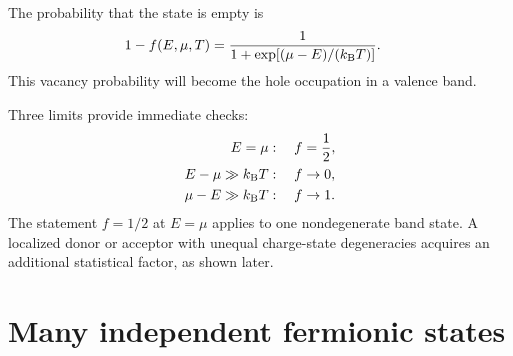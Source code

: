 The probability that the state is empty is
\begin{equation}
\begin{aligned}
  1-f(E,\mu,T)
  &=\frac{1}{1+\exp[(\mu-E)/(k_{\mathrm B} T)]}.
\end{aligned}
  \label{eq:empty-fermion-state-probability-statmech}
\end{equation}
This vacancy probability will become the hole occupation in a valence band.

Three limits provide immediate checks:
\begin{align}
  E=\mu&:\quad f=\frac12,
  \label{eq:statmech-half-occupation}\\
  E-\mu\gg k_{\mathrm B} T&:\quad f\rightarrow0,
  \label{eq:statmech-empty-high-state}\\
  \mu-E\gg k_{\mathrm B} T&:\quad f\rightarrow1.
  \label{eq:statmech-filled-low-state}
\end{align}
The statement $f=1/2$ at $E=\mu$ applies to one nondegenerate band state.  A
localized donor or acceptor with unequal charge-state degeneracies acquires an
additional statistical factor, as shown later.

\section{Many independent fermionic states}

